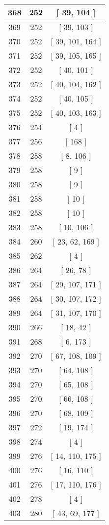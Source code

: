 \begin{center}
\begin{longtable}[H]{|| c c c ||}
368 & 252 & [ 39, 104 ]
\\\hline
369 & 252 & [ 39, 103 ]
\\\hline
370 & 252 & [ 39, 101, 164 ]
\\\hline
371 & 252 & [ 39, 105, 165 ]
\\\hline
372 & 252 & [ 40, 101 ]
\\\hline
373 & 252 & [ 40, 104, 162 ]
\\\hline
374 & 252 & [ 40, 105 ]
\\\hline
375 & 252 & [ 40, 103, 163 ]
\\\hline
376 & 254 & [ 4 ]
\\\hline
377 & 256 & [ 168 ]
\\\hline
378 & 258 & [ 8, 106 ]
\\\hline
379 & 258 & [ 9 ]
\\\hline
380 & 258 & [ 9 ]
\\\hline
381 & 258 & [ 10 ]
\\\hline
382 & 258 & [ 10 ]
\\\hline
383 & 258 & [ 10, 106 ]
\\\hline
384 & 260 & [ 23, 62, 169 ]
\\\hline
385 & 262 & [ 4 ]
\\\hline
386 & 264 & [ 26, 78 ]
\\\hline
387 & 264 & [ 29, 107, 171 ]
\\\hline
388 & 264 & [ 30, 107, 172 ]
\\\hline
389 & 264 & [ 31, 107, 170 ]
\\\hline
390 & 266 & [ 18, 42 ]
\\\hline
391 & 268 & [ 6, 173 ]
\\\hline
392 & 270 & [ 67, 108, 109 ]
\\\hline
393 & 270 & [ 64, 108 ]
\\\hline
394 & 270 & [ 65, 108 ]
\\\hline
395 & 270 & [ 66, 108 ]
\\\hline
396 & 270 & [ 68, 109 ]
\\\hline
397 & 272 & [ 19, 174 ]
\\\hline
398 & 274 & [ 4 ]
\\\hline
399 & 276 & [ 14, 110, 175 ]
\\\hline
400 & 276 & [ 16, 110 ]
\\\hline
401 & 276 & [ 17, 110, 176 ]
\\\hline
402 & 278 & [ 4 ]
\\\hline
403 & 280 & [ 43, 69, 177 ]
\\\hline

\end{longtable}
\end{center}
